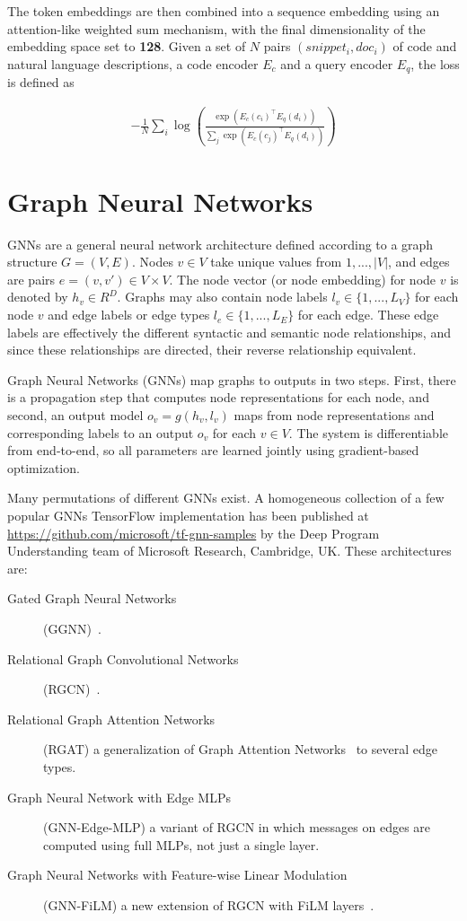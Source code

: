 \documentclass{article}
\begin{document}
The token embeddings are then combined into a sequence embedding using an attention-like weighted sum mechanism, with the final dimensionality of the embedding space set to \textbf{128}.
Given a set of $N$ pairs $(snippet_i, doc_i)$ of code and natural language descriptions, a code encoder $E_c$ and a query encoder $E_q$, the loss is defined as 

\begin{align*}
  -\frac{1}{N}\sum_i
        \log\left(\frac{\exp(E_c(c_i)^\top E_q(d_i))}
                       {\sum_ j \exp(E_c(c_j)^\top E_q(d_i))}\right)
\end{align*}

\section{Graph Neural Networks}

GNNs are a general neural network architecture defined according to a graph structure $G = (V, E)$. Nodes $v \in V$ take unique values from $1, . . . , |V|$, and edges are pairs $e = (v, v') \in V \times V$. 
The node vector (or node embedding) for node $v$ is denoted by $h_v \in R^D$. Graphs may also contain node labels $l_v \in \{1, . . . , L_V \}$ for each node $v$ and edge labels or edge types $l_e \in \{1, . . . , L_E \}$ for each edge. These edge labels are effectively the different syntactic and semantic node relationships, and since these relationships are directed, their reverse relationship equivalent.

Graph Neural Networks (GNNs) map graphs to outputs in two steps. First, there is a propagation step that computes node representations for each node, and second, an output model $o_v = g(h_v, l_v)$ maps from node representations and corresponding labels to an output $o_v$ for each $v \in V$. The system is differentiable from end-to-end, so all parameters are learned jointly using gradient-based optimization\cite{1511.05493}.

Many permutations of different GNNs exist. A homogeneous collection of a few popular GNNs TensorFlow implementation has been published at \url{https://github.com/microsoft/tf-gnn-samples} by the Deep Program Understanding team of  Microsoft Research, Cambridge, UK. 
These architectures are:
\begin{description}
    \item[Gated Graph Neural Networks] (GGNN)~\cite{1511.05493}.
    \item[Relational Graph Convolutional Networks] (RGCN)~\cite{1703.06103}.
    \item[Relational Graph Attention Networks] (RGAT) a generalization of Graph Attention Networks~\cite{1710.10903} to several edge types.
    \item[Graph Neural Network with Edge MLPs] (GNN-Edge-MLP) a variant of RGCN in which messages on edges are computed using full MLPs, not just a single layer.
    \item[Graph Neural Networks with Feature-wise Linear Modulation] (GNN-FiLM) a new extension of RGCN with FiLM layers~\cite{1709.07871}.
\end{description}
\end{document}
